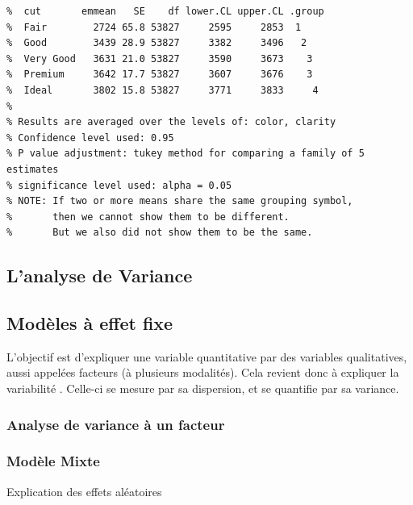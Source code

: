\documentclass[
]{article}
\newenvironment{Shaded}{\begin{snugshade}}{\end{snugshade}}
\newcommand{\AttributeTok}[1]{\textcolor[rgb]{0.77,0.63,0.00}{#1}}
\newcommand{\CommentTok}[1]{\textcolor[rgb]{0.56,0.35,0.01}{\textit{#1}}}
\newcommand{\DecValTok}[1]{\textcolor[rgb]{0.00,0.00,0.81}{#1}}
\newcommand{\FunctionTok}[1]{\textcolor[rgb]{0.00,0.00,0.00}{#1}}
\newcommand{\NormalTok}[1]{#1}
\newcommand{\OtherTok}[1]{\textcolor[rgb]{0.56,0.35,0.01}{#1}}
\newcommand{\SpecialCharTok}[1]{\textcolor[rgb]{0.00,0.00,0.00}{#1}}
\newcommand{\StringTok}[1]{\textcolor[rgb]{0.31,0.60,0.02}{#1}}
\begin{document}
\begin{verbatim}
%  cut       emmean   SE    df lower.CL upper.CL .group
%  Fair        2724 65.8 53827     2595     2853  1    
%  Good        3439 28.9 53827     3382     3496   2   
%  Very Good   3631 21.0 53827     3590     3673    3  
%  Premium     3642 17.7 53827     3607     3676    3  
%  Ideal       3802 15.8 53827     3771     3833     4 
% 
% Results are averaged over the levels of: color, clarity 
% Confidence level used: 0.95 
% P value adjustment: tukey method for comparing a family of 5 estimates 
% significance level used: alpha = 0.05 
% NOTE: If two or more means share the same grouping symbol,
%       then we cannot show them to be different.
%       But we also did not show them to be the same.
\end{verbatim}

\hypertarget{lanalyse-de-variance}{%
\subsection{L'analyse de Variance}\label{lanalyse-de-variance}}

\hypertarget{moduxe8les-uxe0-effet-fixe}{%
\subsection{Modèles à effet fixe}\label{moduxe8les-uxe0-effet-fixe}}

L'objectif est d'expliquer une variable quantitative par des variables
qualitatives, aussi appelées facteurs (à plusieurs modalités). Cela
revient donc à expliquer la variabilité . Celle-ci se mesure par sa
dispersion, et se quantifie par sa variance.

\hypertarget{analyse-de-variance-uxe0-un-facteur}{%
\subsubsection{Analyse de variance à un
facteur}\label{analyse-de-variance-uxe0-un-facteur}}

\hypertarget{moduxe8le-mixte}{%
\subsubsection{Modèle Mixte}\label{moduxe8le-mixte}}

Explication des effets aléatoires

\begin{Shaded}
\end{Shaded}
\end{document}
